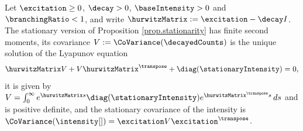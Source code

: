\begin{thm}\label{thm.lyapunov}
 Let $\excitation \geq 0$, $\decay > 0$, $\baseIntensity > 0$ and $\branchingRatio < 1$,
 and write $\hurwitzMatrix := \excitation - \decay I$.
 The stationary version of Proposition \ref{prop.stationarity} has finite second moments,
 its covariance $V := \CoVariance(\decayedCounts)$ is the unique solution of the Lyapunov
 equation
 \begin{equation}\label{eq.lyapunov}
  \hurwitzMatrix V + V \hurwitzMatrix^{\transpose} + \diag(\stationaryIntensity) = 0 ,
 \end{equation}
 it is given by
 $V = \int_{0}^{\infty} e^{\hurwitzMatrix s} \diag(\stationaryIntensity)
 e^{\hurwitzMatrix^{\transpose} s} \, ds$ and is positive definite,
 and the stationary covariance of the intensity is
 $\CoVariance(\intensity[ ]) = \excitation V \excitation^{\transpose}$.
\end{thm}
